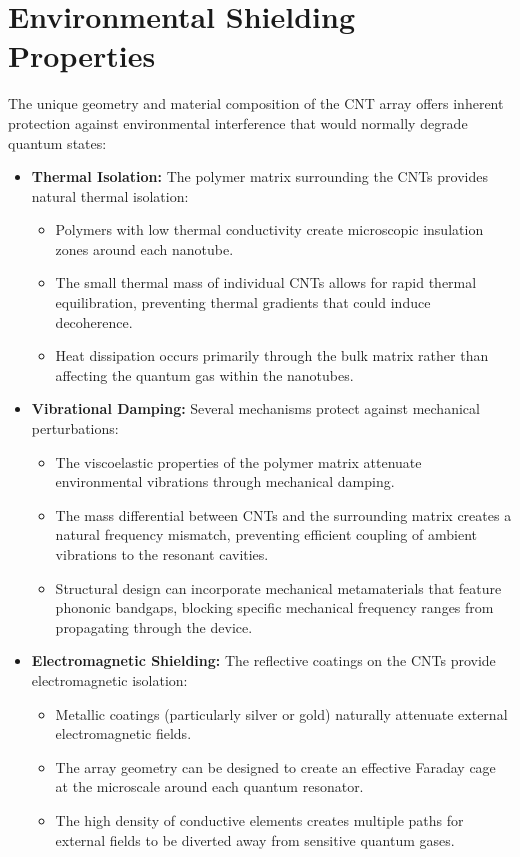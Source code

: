 \documentclass[11pt]{article}
\begin{document}
	\section{Environmental Shielding Properties}
	The unique geometry and material composition of the CNT array offers inherent protection against environmental interference that would normally degrade quantum states:
	
	\begin{itemize}
		\item \textbf{Thermal Isolation:} The polymer matrix surrounding the CNTs provides natural thermal isolation:
		\begin{itemize}
			\item Polymers with low thermal conductivity create microscopic insulation zones around each nanotube.
			\item The small thermal mass of individual CNTs allows for rapid thermal equilibration, preventing thermal gradients that could induce decoherence.
			\item Heat dissipation occurs primarily through the bulk matrix rather than affecting the quantum gas within the nanotubes.
		\end{itemize}
		
		\item \textbf{Vibrational Damping:} Several mechanisms protect against mechanical perturbations:
		\begin{itemize}
			\item The viscoelastic properties of the polymer matrix attenuate environmental vibrations through mechanical damping.
			\item The mass differential between CNTs and the surrounding matrix creates a natural frequency mismatch, preventing efficient coupling of ambient vibrations to the resonant cavities.
			\item Structural design can incorporate mechanical metamaterials that feature phononic bandgaps, blocking specific mechanical frequency ranges from propagating through the device.
		\end{itemize}
		
		\item \textbf{Electromagnetic Shielding:} The reflective coatings on the CNTs provide electromagnetic isolation:
		\begin{itemize}
			\item Metallic coatings (particularly silver or gold) naturally attenuate external electromagnetic fields.
			\item The array geometry can be designed to create an effective Faraday cage at the microscale around each quantum resonator.
			\item The high density of conductive elements creates multiple paths for external fields to be diverted away from sensitive quantum gases.
		\end{itemize}
		

\end{itemize}
\end{document}
